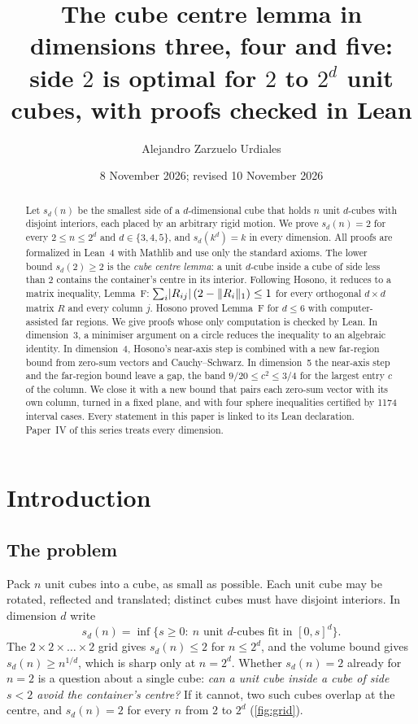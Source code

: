 \documentclass[11pt,a4paper]{article}
\title{The cube centre lemma in dimensions three, four and five:\\
side $2$ is optimal for $2$ to $2^d$ unit cubes, with proofs checked in Lean}
\author{Alejandro Zarzuelo Urdiales}
\date{8 November 2026; revised 10 November 2026}
\begin{document}
\maketitle

\begin{abstract}
Let $s_d(n)$ be the smallest side of a $d$-dimensional cube that holds $n$ unit $d$-cubes with disjoint interiors, each placed by an arbitrary rigid motion. We prove $s_d(n)=2$ for every $2\le n\le 2^d$ and $d\in\{3,4,5\}$, and $s_d(k^d)=k$ in every dimension. All proofs are formalized in Lean~4 with Mathlib and use only the standard axioms. The lower bound $s_d(2)\ge 2$ is the \emph{cube centre lemma}: a unit $d$-cube inside a cube of side less than $2$ contains the container's centre in its interior. Following Hosono, it reduces to a matrix inequality, Lemma~F: $\sum_i \lvert R_{ij}\rvert\,(2-\lVert R_i\rVert_1)\le 1$ for every orthogonal $d\times d$ matrix $R$ and every column $j$. Hosono proved Lemma~F for $d\le 6$ with computer-assisted far regions. We give proofs whose only computation is checked by Lean. In dimension~3, a minimiser argument on a circle reduces the inequality to an algebraic identity. In dimension~4, Hosono's near-axis step is combined with a new far-region bound from zero-sum vectors and Cauchy--Schwarz. In dimension~5 the near-axis step and the far-region bound leave a gap, the band $9/20\le c^2\le 3/4$ for the largest entry $c$ of the column. We close it with a new bound that pairs each zero-sum vector with its own column, turned in a fixed plane, and with four sphere inequalities certified by 1174 interval cases. Every statement in this paper is linked to its Lean declaration. Paper~IV of this series treats every dimension.
\end{abstract}

\tableofcontents

\section{Introduction}\label{sec:intro}

\subsection{The problem}
Pack $n$ unit cubes into a cube, as small as possible. Each unit cube may be rotated, reflected and translated; distinct cubes must have disjoint interiors. In dimension $d$ write
\[
s_d(n)=\inf\{s\ge0:\ n\text{ unit $d$-cubes fit in }[0,s]^d\}.
\]
The $2\times2\times\dots\times2$ grid gives $s_d(n)\le 2$ for $n\le 2^d$, and the volume bound gives $s_d(n)\ge n^{1/d}$, which is sharp only at $n=2^d$. Whether $s_d(n)=2$ already for $n=2$ is a question about a single cube: \emph{can a unit cube inside a cube of side $s<2$ avoid the container's centre?} If it cannot, two such cubes overlap at the centre, and $s_d(n)=2$ for every $n$ from $2$ to $2^d$ (\cref{fig:grid}).
\end{document}
